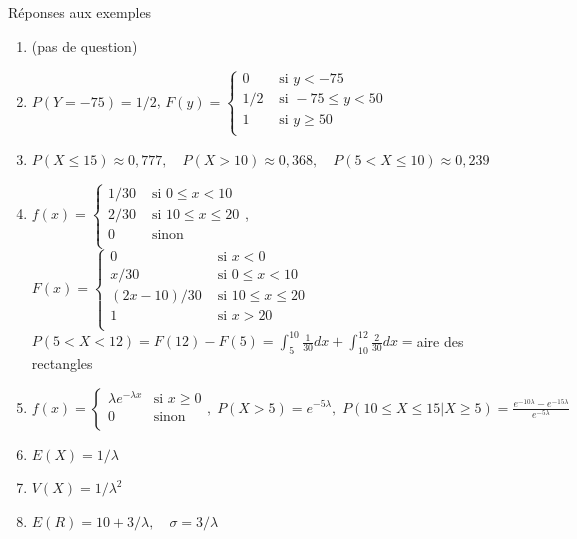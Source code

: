 \documentclass[handout]{BeamerTemplate}
\begin{document}
\begin{frame}[t]{Réponses aux exemples}

\scriptsize
\begin{enumerate}
  \item (pas de question)
  \item $P(Y=-75)=1/2$, $F(y)=\left\{
      \begin{array}{ll}
      0 & \text{ si } y<-75\\
      1/2 & \text{ si } -75\leq y<50\\
      1 & \text{ si } y\geq 50\\
      \end{array}\right.$
  \item $P(X\leq 15)\approx0,777,\quad P(X> 10)\approx 0,368, \quad P(5<X\leq 10)\approx 0,239$
  \item $f(x)=\left\{
      \begin{array}{ll}
      1/30 & \text{ si } 0\leq x <10\\
      2/30 & \text{ si } 10\leq x\leq20\\
      0 & \text{ sinon }\\
      \end{array}\right.$, $F(x)=\left\{
      \begin{array}{ll}
      0 & \text{ si } x<0\\
      x/30 & \text{ si } 0\leq x <10\\
      (2x-10)/30 & \text{ si }  10\leq x \leq20\\
      1 & \text{ si } x>20\\
      \end{array}\right.$
      $P(5<X<12)=F(12)-F(5)=\displaystyle\int_5^{10}\frac{1}{30}dx+\int_{10}^{12}\frac{2}{30}dx=$aire des  rectangles
  \item $f(x)=\left\{
      \begin{array}{ll}
      \lambda e^{-\lambda x} & \text{si }  x \geq 0\\
      0 & \text{sinon }\\
      \end{array}\right.,\; P(X>5)=e^{-5\lambda},\; P(10\leq X\leq 15|X\geq5)=\frac{e^{-10\lambda}-e^{-15\lambda}}{e^{-5\lambda}}$
  \item $E(X)=1/\lambda$
  \item $V(X)=1/\lambda^2$
  \item $E(R)=10+3/\lambda,\quad \sigma=3/\lambda$
 \end{enumerate}
\end{frame}
\end{document}
